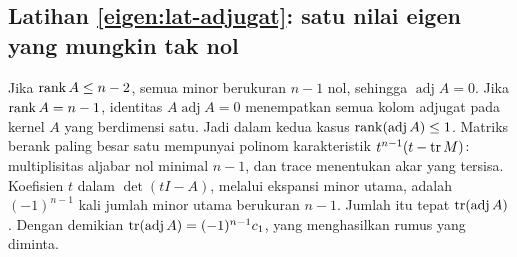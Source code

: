 \subsection*{Latihan \ref{eigen:lat-adjugat}: satu nilai eigen yang mungkin tak nol}
Jika $\operatorname{rank} A\le n-2$, semua minor berukuran $n-1$ nol,
sehingga $\operatorname{adj}A=0$.
Jika $\operatorname{rank} A=n-1$, identitas $A\operatorname{adj}A=0$
menempatkan semua kolom adjugat pada kernel $A$ yang berdimensi satu.
Jadi dalam kedua kasus $\operatorname{rank}(\operatorname{adj}A)\le1$.
Matriks berank paling besar satu mempunyai polinom karakteristik
$t^{n-1}(t-\operatorname{tr} M)$: multiplisitas aljabar nol minimal $n-1$,
dan trace menentukan akar yang tersisa.
Koefisien $t$ dalam $\det(tI-A)$, melalui ekspansi minor utama,
adalah $(-1)^{n-1}$ kali jumlah minor utama berukuran $n-1$.
Jumlah itu tepat $\operatorname{tr}(\operatorname{adj}A)$.
Dengan demikian $\operatorname{tr}(\operatorname{adj}A)=(-1)^{n-1}c_1$,
yang menghasilkan rumus yang diminta.
\fi
